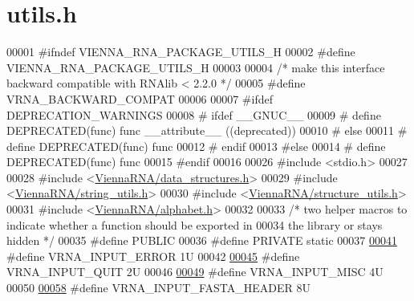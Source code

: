 \hypertarget{utils_8h_source}{}\section{utils.\+h}
\label{utils_8h_source}

\begin{DoxyCode}
00001 \textcolor{preprocessor}{#ifndef VIENNA\_RNA\_PACKAGE\_UTILS\_H}
00002 \textcolor{preprocessor}{#define VIENNA\_RNA\_PACKAGE\_UTILS\_H}
00003 
00004 \textcolor{comment}{/* make this interface backward compatible with RNAlib < 2.2.0 */}
00005 \textcolor{preprocessor}{#define VRNA\_BACKWARD\_COMPAT}
00006 
00007 \textcolor{preprocessor}{#ifdef DEPRECATION\_WARNINGS}
00008 \textcolor{preprocessor}{# ifdef \_\_GNUC\_\_}
00009 \textcolor{preprocessor}{#  define DEPRECATED(func) func \_\_attribute\_\_ ((deprecated))}
00010 \textcolor{preprocessor}{# else}
00011 \textcolor{preprocessor}{#  define DEPRECATED(func) func}
00012 \textcolor{preprocessor}{# endif}
00013 \textcolor{preprocessor}{#else}
00014 \textcolor{preprocessor}{# define DEPRECATED(func) func}
00015 \textcolor{preprocessor}{#endif}
00016 
00026 \textcolor{preprocessor}{#include <stdio.h>}
00027 
00028 \textcolor{preprocessor}{#include <\hyperlink{data__structures_8h}{ViennaRNA/data\_structures.h}>}
00029 \textcolor{preprocessor}{#include <\hyperlink{string__utils_8h}{ViennaRNA/string\_utils.h}>}
00030 \textcolor{preprocessor}{#include <\hyperlink{structure__utils_8h}{ViennaRNA/structure\_utils.h}>}
00031 \textcolor{preprocessor}{#include <\hyperlink{alphabet_8h}{ViennaRNA/alphabet.h}>}
00032 
00033 \textcolor{comment}{/* two helper macros to indicate whether a function should be exported in}
00034 \textcolor{comment}{the library or stays hidden */}
00035 \textcolor{preprocessor}{#define PUBLIC}
00036 \textcolor{preprocessor}{#define PRIVATE static}
00037 
\hypertarget{utils_8h_source_l00041}{}\hyperlink{group__utils_gad403c9ea58f1836689404c2931419c8c}{00041} \textcolor{preprocessor}{#define VRNA\_INPUT\_ERROR                  1U}
00042 
\hypertarget{utils_8h_source_l00045}{}\hyperlink{group__utils_ga72f3c6ca5c83d2b9baed2922d19c403d}{00045} \textcolor{preprocessor}{#define VRNA\_INPUT\_QUIT                   2U}
00046 
\hypertarget{utils_8h_source_l00049}{}\hyperlink{group__utils_ga8e3241b321c9c1a78a69e59e2e019a71}{00049} \textcolor{preprocessor}{#define VRNA\_INPUT\_MISC                   4U}
00050 
\hypertarget{utils_8h_source_l00058}{}\hyperlink{group__utils_ga2f0d8069e93d3ac54d9320d6bdb8e7e7}{00058} \textcolor{preprocessor}{#define VRNA\_INPUT\_FASTA\_HEADER           8U}

\end{DoxyCode}
